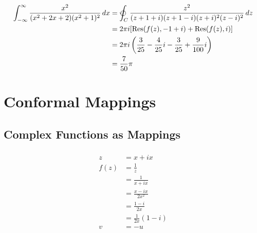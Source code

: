 \documentclass{article}
\newcommand{\Res}{\operatorname{Res}}
\begin{document}
\setcounter{subsubsection}{30}
\subsubsection{}

\begin{align*}
  \int_{-\infty}^\infty \frac{x^2}{(x^2 + 2 x + 2) (x^2 + 1)^2} \,d x & = \varointctrclockwise_C \frac{z^2}{(z + 1 + i) (z + 1 - i) (z + i)^2 (z - i)^2} \,d z  \\
                                                                      & = 2 \pi i [\Res(f(z), -1 + i) + \Res(f(z), i)]                                          \\
                                                                      & = 2 \pi i \left( \frac{3}{25} - \frac{4}{25} i - \frac{3}{25} + \frac{9}{100} i \right) \\
                                                                      & = \frac{7}{50} \pi
\end{align*}

\section{Conformal Mappings}

\subsection{Complex Functions as Mappings}

\subsubsection{}

\begin{align*}
  z    & = x + i x               \\
  f(z) & = \frac{1}{z}           \\
       & = \frac{1}{x + i x}     \\
       & = \frac{x - i x}{2 x^2} \\
       & = \frac{1 - i}{2 x}     \\
       & = \frac{1}{2 x} (1 - i) \\
  v    & = -u
\end{align*}

\setcounter{subsubsection}{2}
\subsubsection{}
\end{document}
